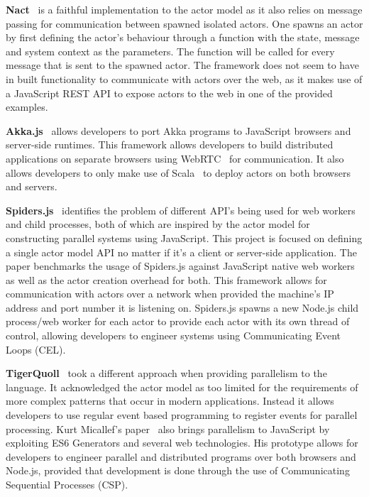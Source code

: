 \documentclass[12pt, a4paper]{report}
\theoremstyle{definition}
\theoremstyle{definition}%
\theoremstyle{definition}%
\theoremstyle{definition}%
\theoremstyle{definition}%
\theoremstyle{definition}%
\begin{document}
\textbf{Nact}~\cite{nact} is a faithful implementation to the actor model as it also relies on message passing for communication between spawned isolated actors. One spawns an actor by first defining the actor's behaviour through a function with the state, message and system context as the parameters. The function will be called for every message that is sent to the spawned actor. The framework does not seem to have in built functionality to communicate with actors over the web, as it makes use of a JavaScript REST API to expose actors to the web in one of the provided examples.

\textbf{Akka.js}~\cite{stivan2015akka} allows developers to port Akka programs to JavaScript browsers and server-side runtimes. This framework allows developers to build distributed applications on separate browsers using WebRTC~\cite{webrtc} for communication. It also allows developers to only make use of Scala~\cite{scala} to deploy actors on both browsers and servers.

\textbf{Spiders.js}~\cite{spidersjs} identifies the problem of different API's being used for web workers and child processes, both of which are inspired by the actor model for constructing parallel systems using JavaScript. This project is focused on defining a single actor model API no matter if it's a client or server-side application. The paper benchmarks the usage of Spiders.js against JavaScript native web workers as well as the actor creation overhead for both. This framework allows for communication with actors over a network when provided the machine's IP address and port number it is listening on. Spiders.js spawns a new Node.js child process/web worker for each actor to provide each actor with its own thread of control, allowing developers to engineer systems using Communicating Event Loops (CEL).

\textbf{TigerQuoll}~\cite{tigerquoll} took a different approach when providing parallelism to the language. It acknowledged the actor model as too limited for the requirements of more complex patterns that occur in modern applications. Instead it allows developers to use regular event based programming to register events for parallel processing. Kurt Micallef's paper~\cite{kurt} also brings parallelism to JavaScript by exploiting ES6 Generators and several web technologies. His prototype allows for developers to engineer parallel and distributed programs over both browsers and Node.js, provided that development is done through the use of Communicating Sequential Processes (CSP).
\end{document}
